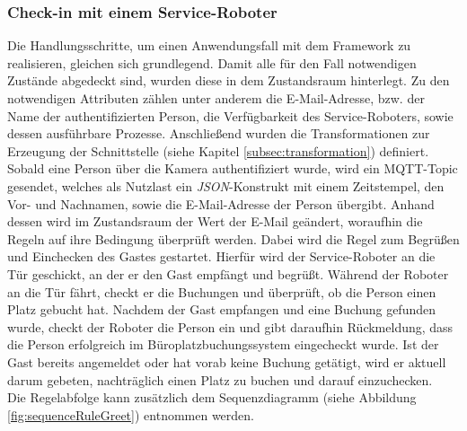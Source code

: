     \subsubsection*{Check-in mit einem Service-Roboter}
        Die Handlungsschritte, um einen Anwendungsfall mit dem Framework zu realisieren, gleichen sich grundlegend. 
        Damit alle für den Fall notwendigen Zustände abgedeckt sind, wurden diese in dem Zustandsraum hinterlegt. Zu den notwendigen Attributen 
        zählen unter anderem die E-Mail-Adresse, bzw. der Name der authentifizierten Person, die Verfügbarkeit des Service-Roboters, sowie dessen 
        ausführbare Prozesse. Anschließend wurden die Transformationen zur Erzeugung der Schnittstelle (siehe Kapitel \ref{subsec:transformation}) definiert. 
        \\
        \linebreak
        Sobald eine Person über die Kamera authentifiziert wurde, wird ein \acs{MQTT}-Topic gesendet, welches als Nutzlast ein \textit{JSON}-Konstrukt mit einem Zeitstempel, den 
        Vor- und Nachnamen, sowie die E-Mail-Adresse der Person übergibt. Anhand dessen wird im Zustandsraum der Wert der E-Mail geändert, woraufhin die Regeln auf ihre 
        Bedingung überprüft werden. Dabei wird die Regel zum Begrüßen und Einchecken des Gastes gestartet. Hierfür wird der Service-Roboter an die Tür geschickt, an der er den 
        Gast empfängt und begrüßt. Während der Roboter an die Tür fährt, checkt er die Buchungen und überprüft, ob die Person einen Platz gebucht hat. 
        Nachdem der Gast empfangen und eine Buchung gefunden wurde, checkt der Roboter die Person ein und gibt daraufhin Rückmeldung, dass die Person erfolgreich im 
        Büroplatzbuchungssystem eingecheckt wurde. Ist der Gast bereits angemeldet oder hat vorab keine Buchung getätigt, wird er aktuell darum gebeten, nachträglich 
        einen Platz zu buchen und darauf einzuchecken. 
        \\
        Die Regelabfolge kann zusätzlich dem Sequenzdiagramm (siehe Abbildung \ref{fig:sequenceRuleGreet}) entnommen werden.
